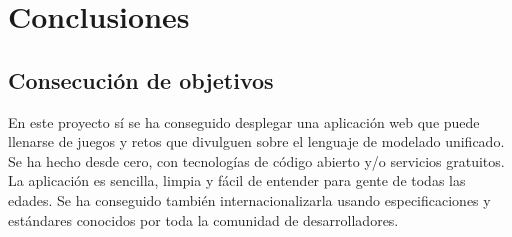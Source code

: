 \documentclass[a4paper, 12pt]{book}
\begin{document}

\cleardoublepage


\chapter{Conclusiones}
\label{chap:conclusiones}


\section{Consecución de objetivos}
\label{sec:consecucion-objetivos}

En este proyecto sí se ha conseguido desplegar una aplicación web que puede llenarse de juegos y retos que divulguen sobre el lenguaje de modelado unificado. Se ha hecho desde cero, con tecnologías de código abierto y/o servicios gratuitos. La aplicación es sencilla, limpia y fácil de entender para gente de todas las edades. Se ha conseguido también internacionalizarla usando especificaciones y estándares conocidos por toda la comunidad de desarrolladores.
\end{document}
